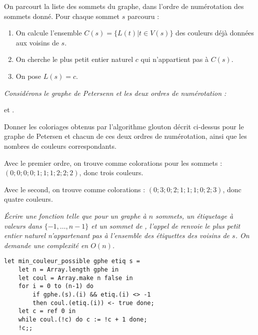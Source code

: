 On parcourt la liste des sommets du graphe, dans l'ordre de numérotation des sommets donné. Pour chaque sommet $s$ parcouru : 
\begin{enumerate}
    \item On calcule l'ensemble $C(s) = \{ L(t) | t \in V(s) \}$ des couleurs déjà données aux voisins de $s$. 
    \item On cherche le plus petit entier naturel $c$ qui n'appartient pas à $C(s)$. 
    \item On pose $L(s) = c$.
\end{enumerate} 
\begin{Exercise}\it  
Considérons le graphe de Petersenn et les deux ordres de numérotation :

 et . 

Donner les coloriages obtenus par l'algorithme glouton décrit ci-dessus pour le graphe de Petersen et chacun de ces deux ordres de numérotation, ainsi que les nombres de couleurs correspondants. 
\end{Exercise} 
\begin{Answer}
Avec le premier ordre, on trouve comme colorations pour les sommets : $(0;0;0;0;1;1;1;2;2;2)$, donc trois couleurs. 

Avec le second, on trouve comme colorations : $(0;3;0;2;1;1;1;0;2;3)$, donc quatre couleurs.

\newpage
\end{Answer}
\begin{Exercise} \it 
Écrire une fonction 
telle que pour un graphe  à $n$ sommets, un étiquetage  à valeurs dans $\{-1,\dots,n-1\}$ et un sommet  de , l'appel de  renvoie le plus petit entier naturel n'appartenant pas à l'ensemble des étiquettes des voisins de $s$. On demande une complexité en $O(n)$. 
\end{Exercise} 
\begin{Answer}
\begin{lstlisting}
let min_couleur_possible gphe etiq s =
    let n = Array.length gphe in
    let coul = Array.make n false in
    for i = 0 to (n-1) do
        if gphe.(s).(i) && etiq.(i) <> -1
        then coul.(etiq.(i)) <- true done;
    let c = ref 0 in
    while coul.(!c) do c := !c + 1 done;
    !c;;
\end{lstlisting}
\end{Answer}
